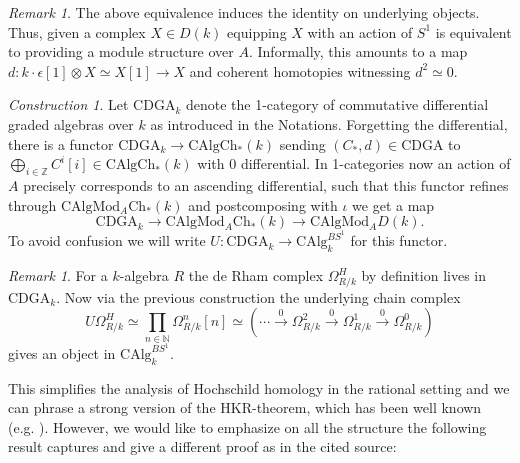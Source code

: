 \documentclass[10pt, reqno]{amsart}
\theoremstyle{definition}
\theoremstyle{remark}
\newtheorem{remark}[theorem]{Remark}
\newtheorem{construction}[theorem]{Construction}
\newcommand{\Z}{\mathbb{Z}}
\newcommand{\N}{\mathbb{N}}
\newcommand{\CAlg}{\mathrm{CAlg}}
\newcommand{\dr}[3]{\Omega^{#3}_{#1/#2}}
\newcommand{\Ch}{\mathrm{Ch}}
\newcommand{\Mod}{\mathrm{Mod}}
\newcommand{\CDGA}{\mathrm{CDGA}}
\begin{document}
\begin{remark}
	The above equivalence induces the identity on underlying objects. Thus, given a complex $X\in D(k)$ equipping $X$ with an action of $S^1$ is equivalent to providing a module structure over $A$. Informally, this amounts to a map $d\colon k\cdot \epsilon[1]\otimes X\simeq X[1]\to X$ and coherent homotopies witnessing $d^2\simeq 0$.  
\end{remark}

\begin{construction}
	Let $\CDGA_k$ denote the 1-category of commutative differential graded algebras over $k$ as introduced in the Notations. Forgetting the differential, there is a functor $\CDGA_k\to\CAlg\Ch_*(k)$ sending $(C_*,d)\in \CDGA$ to $\bigoplus_{i\in\Z} C^i[i]\in\CAlg\Ch_*(k)$ with 0 differential. In 1-categories now an action of $A$ precisely corresponds to an ascending differential, such that this functor refines through $\CAlg\Mod_A\Ch_*(k)$ and postcomposing with $\iota$ we get a map
	\[\CDGA_k\to\CAlg\Mod_A\Ch_*(k)\to\CAlg\Mod_A D(k).\]
	To avoid confusion we will write $U\colon\CDGA_k\to\CAlg_k^{BS^1}$ for this functor.\label{deRham}
\end{construction}
	
\begin{remark}	
	For a $k$-algebra $R$ the de Rham complex $\dr RkH$ by definition lives in $\CDGA_k$. Now via the previous construction the underlying chain complex 
	\begin{equation}\label{derham}U\dr RkH\simeq\prod_{n\in\N}\dr Rkn[n]\simeq\left(\cdots\xrightarrow 0\dr Rk2\xrightarrow 0 \dr Rk1\xrightarrow 0 \dr Rk0\right)\end{equation}
	gives an object in $\CAlg_k^{BS^1}$.
\end{remark}

This simplifies the analysis of Hochschild homology in the rational setting and we can phrase a strong version of the HKR-theorem, which has been well known (e.g. \cite{Qui70}). However, we would like to emphasize on all the structure the following result captures and give a different proof as in the cited source:
\end{document}
